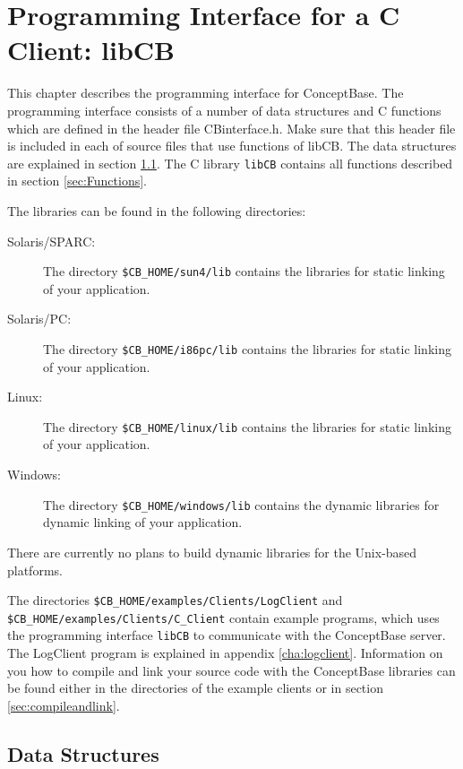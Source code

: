 
\chapter{Programming Interface for a C Client: libCB}
\label{cha:c-client}


This chapter describes the programming interface for ConceptBase.
The programming interface consists of a number of data structures
and C functions which are defined in the header file {\ttfamily CBinterface.h}.
Make sure that this header file is included in each of source files
that use functions of libCB.
The data structures are explained in section \ref{sec:data-structures}.
The C library {\tt libCB} contains all functions described in section
\ref{sec:Functions}.

The libraries can be found in the following directories:
\begin{description}
\item[Solaris/SPARC:] The directory \verb+$CB_HOME/sun4/lib+ contains the libraries
for static linking of your application.
\item[Solaris/PC:] The directory \verb+$CB_HOME/i86pc/lib+ contains the libraries
for static linking of your application.
\item[Linux:] The directory \verb+$CB_HOME/linux/lib+ contains the libraries
for static linking of your application.
\item[Windows:] The directory \verb+$CB_HOME/windows/lib+ contains the dynamic libraries
for dynamic linking of your application.
\end{description}

There are currently no plans to build dynamic libraries for the Unix-based
platforms.

The directories \verb+$CB_HOME/examples/Clients/LogClient+ and \\
\verb+$CB_HOME/examples/Clients/C_Client+ contain example
programs, which uses the programming interface {\tt libCB} to communicate
with the ConceptBase server. The {\ttfamily LogClient} program is explained in
appendix \ref{cha:logclient}. Information on you how to compile and link
your source code with the ConceptBase libraries can be found either in
the directories of the example clients or in section \ref{sec:compileandlink}.

\section{Data Structures}
\label{sec:data-structures}

